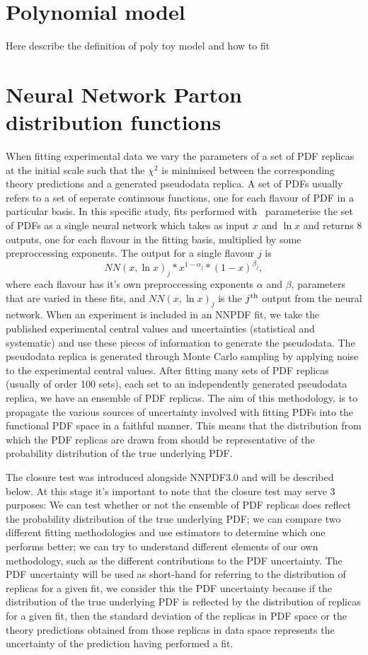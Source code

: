 \section{Polynomial model}
Here describe the definition of poly toy model and how to fit
\section{Neural Network Parton distribution functions}
When fitting experimental data we vary the parameters of a set of PDF replicas
at the initial scale such that the $\chi^2$ is minimised between the
corresponding theory predictions and a generated pseudodata replica. A set of
PDFs usually refers to a set of seperate continuous functions, one for each
flavour of PDF in a particular basis. In this specific study, fits performed
with \nfit\ parameterise the set of PDFs as a single neural network which takes
as input $x$ and $\ln x$ and returns 8 outputs, one for each flavour in the
fitting basis, multiplied by some preproccessing exponents. The output for a
single flavour $j$ is
\begin{equation}
    NN(x, \ln x)_j * x^{1-\alpha_j} * (1-x)^{\beta_j},
\end{equation}
where each flavour has it's own preproccessing exponents $\alpha$ and $\beta$,
parameters that are varied in these fits, and $NN(x, \ln x)_j$ is the
$j^{\rm th}$ output from the neural network.
When an experiment is included in an NNPDF fit, we take the published
experimental central values and uncertainties (statistical and systematic)
and use these pieces of information to generate the pseudodata.
The pseudodata replica is generated
through Monte Carlo sampling by applying noise to the experimental
central values.
After fitting many sets of PDF replicas (usually of order 100 sets),
each set to an independently generated pseudodata replica, we have an ensemble of
PDF replicas.
The aim of this methodology, is to propagate the various sources of
uncertainty involved with fitting PDFs into the functional PDF space in a faithful
manner. This means that the distribution from which the PDF replicas are drawn
from should be representative of the probability distribution of the true
underlying PDF.

The closure test was introduced alongside NNPDF3.0 and will be described below.
At this stage it's important to note that the closure test may serve 3 purposes:
We can test whether or not the ensemble of PDF replicas does reflect the
probability distribution of the true underlying PDF; we can compare two different
fitting methodologies and use estimators to determine which one performs better;
we can try to understand different elements of our own methodology, such as
the different contributions to the PDF uncertainty. The PDF uncertainty will
be used as short-hand for referring to the distribution of replicas for a given
fit, we consider this the PDF uncertainty because if the distribution
of the true underlying PDF is reflected by the distribution of replicas for
a given fit, then the standard deviation of the replicas in PDF space or the
theory predictions obtained from those replicas in data space represents
the uncertainty of the prediction having performed a fit.